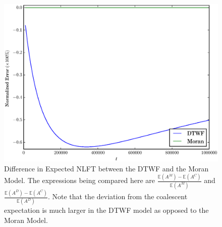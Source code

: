 \documentclass[11pt]{article}
\begin{document}
\begin{center}
	\begin{figure}[!ht]
		\begin{center}
			\includegraphics[scale=0.80]{../plots/moran_figure6}
		\end{center}
		\caption{Difference in Expected NLFT between the DTWF and the Moran Model. The expressions being compared here are $\frac{\mathbb{E}(A^M) - \mathbb{E}(A^C)}{\mathbb{E}(A^M)}$ and $\frac{\mathbb{E}(A^D) - \mathbb{E}(A^C)}{\mathbb{E}(A^D)}$. Note that the deviation from the coalescent expectation is much larger in the DTWF model as opposed to the Moran Model. } 
	\end{figure}	
\end{center}
\end{document}
